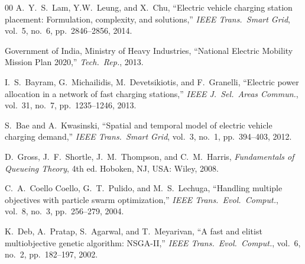 \documentclass[conference]{IEEEtran}
\begin{document}
\begin{thebibliography}{00}
A.\ Y.\ S.\ Lam, Y.\-W.\ Leung, and X.\ Chu, ``Electric vehicle
charging station placement: Formulation, complexity, and
solutions,'' \emph{IEEE Trans.\ Smart Grid}, vol.\ 5, no.\ 6,
pp.\ 2846--2856, 2014.

Government of India, Ministry of Heavy Industries, ``National
Electric Mobility Mission Plan 2020,'' \emph{Tech.\ Rep.}, 2013.

I.\ S.\ Bayram, G.\ Michailidis, M.\ Devetsikiotis, and F.\ Granelli,
``Electric power allocation in a network of fast charging stations,''
\emph{IEEE J.\ Sel.\ Areas Commun.}, vol.\ 31, no.\ 7,
pp.\ 1235--1246, 2013.

S.\ Bae and A.\ Kwasinski, ``Spatial and temporal model of electric
vehicle charging demand,'' \emph{IEEE Trans.\ Smart Grid}, vol.\ 3,
no.\ 1, pp.\ 394--403, 2012.

D.\ Gross, J.\ F.\ Shortle, J.\ M.\ Thompson, and C.\ M.\ Harris,
\emph{Fundamentals of Queueing Theory}, 4th ed. Hoboken, NJ, USA:
Wiley, 2008.

C.\ A.\ Coello Coello, G.\ T.\ Pulido, and M.\ S.\ Lechuga,
``Handling multiple objectives with particle swarm optimization,''
\emph{IEEE Trans.\ Evol.\ Comput.}, vol.\ 8, no.\ 3,
pp.\ 256--279, 2004.

K.\ Deb, A.\ Pratap, S.\ Agarwal, and T.\ Meyarivan, ``A fast and
elitist multiobjective genetic algorithm: NSGA-II,''
\emph{IEEE Trans.\ Evol.\ Comput.}, vol.\ 6, no.\ 2,
pp.\ 182--197, 2002.

\end{thebibliography}
\end{document}
